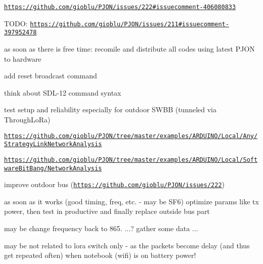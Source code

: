 \begin{DoxyItemize}
\begin{DoxyItemize}
\begin{DoxyItemize}
\end{DoxyItemize}
\end{DoxyItemize}
\item \href{https://github.com/gioblu/PJON/issues/222#issuecomment-406080833}{\tt https\-://github.\-com/gioblu/\-P\-J\-O\-N/issues/222\#issuecomment-\/406080833}
\item T\-O\-D\-O\-: \href{https://github.com/gioblu/PJON/issues/211#issuecomment-397952478}{\tt https\-://github.\-com/gioblu/\-P\-J\-O\-N/issues/211\#issuecomment-\/397952478}
\begin{DoxyItemize}
\item as soon as there is free time\-: recomile and distribute all codes using latest P\-J\-O\-N to hardware
\item add reset broadcast command
\item think about S\-D\-L-\/12 command syntax
\item test setup and reliability especially for outdoor S\-W\-B\-B (tunneled via Through\-Lo\-Ra)
\begin{DoxyItemize}
\item \href{https://github.com/gioblu/PJON/tree/master/examples/ARDUINO/Local/Any/StrategyLinkNetworkAnalysis}{\tt https\-://github.\-com/gioblu/\-P\-J\-O\-N/tree/master/examples/\-A\-R\-D\-U\-I\-N\-O/\-Local/\-Any/\-Strategy\-Link\-Network\-Analysis}
\item \href{https://github.com/gioblu/PJON/tree/master/examples/ARDUINO/Local/SoftwareBitBang/NetworkAnalysis}{\tt https\-://github.\-com/gioblu/\-P\-J\-O\-N/tree/master/examples/\-A\-R\-D\-U\-I\-N\-O/\-Local/\-Software\-Bit\-Bang/\-Network\-Analysis}
\end{DoxyItemize}
\item improve outdoor bus (\href{https://github.com/gioblu/PJON/issues/222}{\tt https\-://github.\-com/gioblu/\-P\-J\-O\-N/issues/222})
\begin{DoxyItemize}
\item as soon as it works (good timing, freq, etc. -\/ may be S\-F6) optimize params like tx power, then test in productive and finally replace outside bus part
\begin{DoxyItemize}
\item may be change frequency back to 865. ...? gather some data ...
\end{DoxyItemize}
\item may be not related to lora switch only -\/ as the packets become delay (and thus get repeated often) when notebook (wifi) is on battery power!

\end{DoxyItemize}
\end{DoxyItemize}
\end{DoxyItemize}
